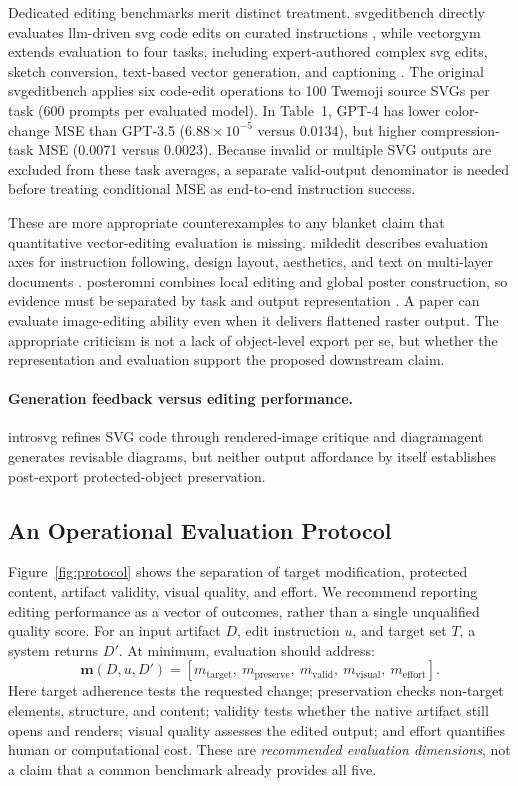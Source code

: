 Dedicated editing benchmarks merit distinct treatment.
\ac{svgeditbench} directly evaluates \ac{llm}-driven \ac{svg} code edits on curated instructions \citep{svgeditbench2024}, while \ac{vectorgym} extends evaluation to four tasks, including expert-authored complex \ac{svg} edits, sketch conversion, text-based vector generation, and captioning \citep{vectorgym2026}.
The original \ac{svgeditbench} applies six code-edit operations to 100 Twemoji source SVGs per task (600 prompts per evaluated model).
In Table~1, GPT-4 has lower color-change MSE than GPT-3.5 (\(6.88\times10^{-5}\) versus 0.0134), but higher compression-task MSE (0.0071 versus 0.0023).
Because invalid or multiple SVG outputs are excluded from these task averages, a separate valid-output denominator is needed before treating conditional MSE as end-to-end instruction success.

These are more appropriate counterexamples to any blanket claim that quantitative vector-editing evaluation is missing.
\ac{mildedit} describes evaluation axes for instruction following, design layout, aesthetics, and text on multi-layer documents \citep{mildedit2026}.
\ac{posteromni} combines local editing and global poster construction, so evidence must be separated by task and output representation \citep{posteromni2026}.
A paper can evaluate image-editing ability even when it delivers flattened raster output.
The appropriate criticism is not a lack of object-level export per se, but whether the representation and evaluation support the proposed downstream claim.

\paragraph{Generation feedback versus editing performance.}
\ac{introsvg} refines SVG code through rendered-image critique and \ac{diagramagent} generates revisable diagrams, but neither output affordance by itself establishes post-export protected-object preservation.

\subsection{An Operational Evaluation Protocol}
Figure~\ref{fig:protocol} shows the separation of target modification, protected content, artifact validity, visual quality, and effort.
We recommend reporting editing performance as a vector of outcomes, rather than a single unqualified quality score.
For an input artifact $D$, edit instruction $u$, and target set $T$, a system returns $D'$.
At minimum, evaluation should address:
\begin{equation}
\mathbf{m}(D,u,D') =
\left[
m_{\mathrm{target}},\
m_{\mathrm{preserve}},\
m_{\mathrm{valid}},\
m_{\mathrm{visual}},\
m_{\mathrm{effort}}
\right].
\label{eq:metrics}
\end{equation}
Here target adherence tests the requested change; preservation checks non-target elements, structure, and content; validity tests whether the native artifact still opens and renders; visual quality assesses the edited output; and effort quantifies human or computational cost.
These are \emph{recommended evaluation dimensions}, not a claim that a common benchmark already provides all five.

